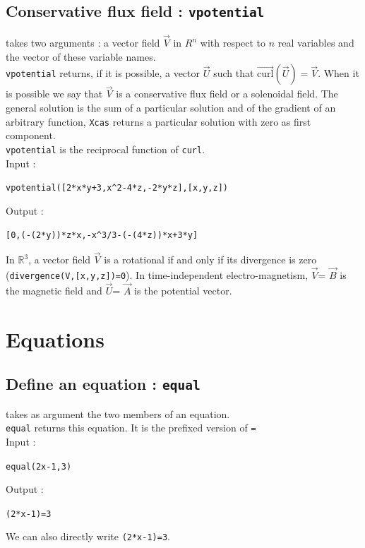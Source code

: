\documentclass[a4paper,11pt]{book}
\newcommand{\R}{{\mathbb{R}}}
\begin{document}
\subsection{Conservative flux field : {\tt vpotential}}
 takes two arguments : a vector field
$\overrightarrow V$ 
in $R^n$ with respect to $n$ real variables 
and the vector of these variable names.\\
{\tt  vpotential} returns, if it is possible, a vector $\overrightarrow U$ such
that $\overrightarrow{\mbox{curl}}(\overrightarrow U)=\overrightarrow V$.
When it is possible we say that  $\overrightarrow V$ is a conservative flux 
field or a solenoidal field.
The general solution is the sum of a particular solution and of the
gradient of an arbitrary function, {\tt Xcas} returns a particular
solution with zero as first component.\\ 
{\tt  vpotential} is the reciprocal function of {\tt curl}.\\
Input :
\begin{center}{\tt vpotential([2*x*y+3,x\verb|^|2-4*z,-2*y*z],[x,y,z]) }\end{center}
Output :~
\begin{center}{\tt [0,(-(2*y))*z*x,-x\verb|^|3/3-(-(4*z))*x+3*y]}\end{center}
In $\R^3$, a vector field $\overrightarrow V$ is a rotational  
if and only if its 
divergence is zero \\({\tt divergence(V,[x,y,z])=0}).
In time-independent electro-magnetism,
$\overrightarrow V$= $\overrightarrow B$ is the magnetic field and
$\overrightarrow U$= $\overrightarrow A$ is the potential vector.

\section{Equations}
\subsection{Define an equation : {\tt equal}}
 takes as argument the two members of an equation.\\
{\tt equal} returns this equation. It is the prefixed version of {\tt =}\\
Input :
\begin{center}{\tt equal(2x-1,3)}\end{center}
Output :
\begin{center}{\tt (2*x-1)=3}\end{center}
We can also directly write {\tt (2*x-1)=3}.
\end{document}
